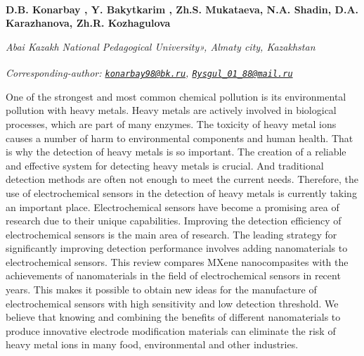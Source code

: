
\begin{articleheader}

{\bfseries D.B. Konarbay\textsuperscript{\envelope } \authorid,
Y. Bakytkarim\textsuperscript{\envelope } \authorid,
Zh.S. Mukataeva\authorid,
N.A. Shadin\authorid,
D.A. Karazhanova\authorid,
Zh.R. Kozhagulova\authorid}
\end{articleheader}

\begin{affiliation}
\emph{Abai Kazakh National Pedagogical University», Almaty city, Kazakhstan}

\raggedright \textsuperscript{\envelope }{\em Corresponding-author: \emph{\href{mailto:konarbay98@bk.ru}{\nolinkurl{konarbay98@bk.ru}}, \href{mailto:Rysgul_01_88@mail.ru}{\nolinkurl{Rysgul\_01\_88@mail.ru}}}}
\end{affiliation}

One of the strongest and most common chemical pollution is its
environmental pollution with heavy metals. Heavy metals are actively
involved in biological processes, which are part of many enzymes. The
toxicity of heavy metal ions causes a number of harm to environmental
components and human health. That is why the detection of heavy metals
is so important. The creation of a reliable and effective system for
detecting heavy metals is crucial. And traditional detection methods are
often not enough to meet the current needs. Therefore, the use of
electrochemical sensors in the detection of heavy metals is currently
taking an important place. Electrochemical sensors have become a
promising area of research due to their unique capabilities. Improving
the detection efficiency of electrochemical sensors is the main area of
research. The leading strategy for significantly improving detection
performance involves adding nanomaterials to electrochemical sensors.
This review compares MXene nanocompasites with the achievements of
nanomaterials in the field of electrochemical sensors in recent years.
This makes it possible to obtain new ideas for the manufacture of
electrochemical sensors with high sensitivity and low detection
threshold. We believe that knowing and combining the benefits of
different nanomaterials to produce innovative electrode modification
materials can eliminate the risk of heavy metal ions in many food,
environmental and other industries.

